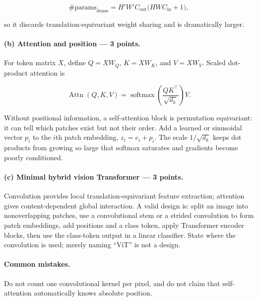\documentclass[11pt,a4paper]{article}
\begin{document}
\[
\#\mathrm{params}_{\mathrm{dense}}
=H'W'C_{\mathrm{out}}\bigl(HWC_{\mathrm{in}}+1\bigr),
\]

so it discards translation-equivariant weight sharing and is dramatically larger.

\paragraph{(b) Attention and position --- 3 points.}

For token matrix $X$, define $Q=XW_Q$, $K=XW_K$, and $V=XW_V$. Scaled dot-product attention is

\[
\operatorname{Attn}(Q,K,V)
=\operatorname{softmax}\left(\frac{QK^\top}{\sqrt{d_k}}\right)V.
\]

Without positional information, a self-attention block is permutation equivariant: it can tell which patches exist but not their order. Add a learned or sinusoidal vector $p_i$ to the $i$th patch embedding, $z_i=e_i+p_i$. The scale $1/\sqrt{d_k}$ keeps dot products from growing so large that softmax saturates and gradients become poorly conditioned.

\paragraph{(c) Minimal hybrid vision Transformer --- 3 points.}

Convolution provides local translation-equivariant feature extraction; attention gives content-dependent global interaction. A valid design is: split an image into nonoverlapping patches, use a convolutional stem or a strided convolution to form patch embeddings, add positions and a class token, apply Transformer encoder blocks, then use the class-token output in a linear classifier. State where the convolution is used; merely naming ``ViT'' is not a design.

\paragraph{Common mistakes.}

Do not count one convolutional kernel per pixel, and do not claim that self-attention automatically knows absolute position.
\end{document}
